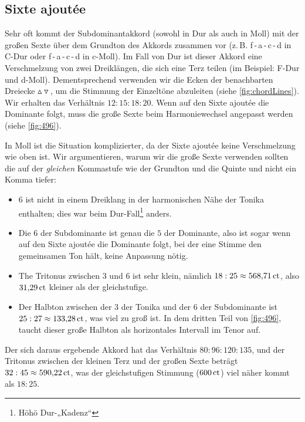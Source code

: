 \subsection{Sixte ajoutée}

Sehr oft kommt der Subdominantakkord (sowohl in Dur als auch in Moll) mit der
großen Sexte über dem Grundton des Akkords zusammen vor
(z.\,B. f\,-\,a\,-\,c\,-\,d in C-Dur oder f\,-\,\flat a\,-\,c\,-\,d in c-Moll).
Im Fall von Dur ist dieser Akkord eine Verschmelzung von zwei Dreiklängen, die
sich eine Terz teilen (im Beispiel: F-Dur und d-Moll). Dementsprechend verwenden
wir die Ecken der benachbarten Dreiecke $\vartriangle\!\!\!\triangledown$, um
die Stimmung der Einzeltöne abzuleiten (siehe \cref{fig:chordLines}). Wir
erhalten das Verhältnis $12:15:18:20$. Wenn auf den Sixte ajoutée die Dominante
folgt, muss die große Sexte beim Harmoniewechsel angepasst werden (siehe
\cref{fig:496}).

In Moll ist die Situation komplizierter, da der Sixte ajoutée keine
Verschmelzung wie oben ist. Wir argumentieren, warum wir die große Sexte
verwenden sollten die auf der \emph{gleichen} Kommastufe wie der Grundton und
die Quinte und nicht ein Komma tiefer:

\begin{itemize}
\item \naturalm $6$ ist nicht in einem Dreiklang in der harmonischen Nähe der 
  Tonika enthalten; dies war beim Dur-Fall\footnote{Höhö Dur-„Kadenz“} anders.
\item Die \natural $6$ der Subdominante ist genau die \natural $5$ der 
  Dominante, also ist sogar
  wenn auf den Sixte ajoutée die Dominante folgt, bei der eine Stimme den
  gemeinsamen Ton hält, keine Anpassung nötig.
\item The Tritonus zwischen \flatp $3$ und \naturalm $6$ ist sehr klein, nämlich
  $18:25\approx 568{,}71\,\mathrm{ct}$, also $31{,}29\,\mathrm{ct}$ kleiner als der
  gleichstufige.
\item Der Halbton zwischen der \flatp $3$ der Tonika und der \naturalm $6$
  der Subdominante ist $25:27\approx 133{,}28\,\mathrm{ct}$, was viel zu groß ist.
  In dem dritten Teil von \cref{fig:496}, taucht dieser große Halbton als
  horizontales Intervall im Tenor auf.
\end{itemize}
Der sich daraus ergebende Akkord hat das Verhältnis $80:96:120:135$, und der
Tritonus zwischen der kleinen Terz und der großen Sexte beträgt
$32:45\approx 590{,}22\,\mathrm{ct}$, was der gleichstufigen Stimmung
($600\,\mathrm{ct}$) viel näher kommt als $18:25$.

